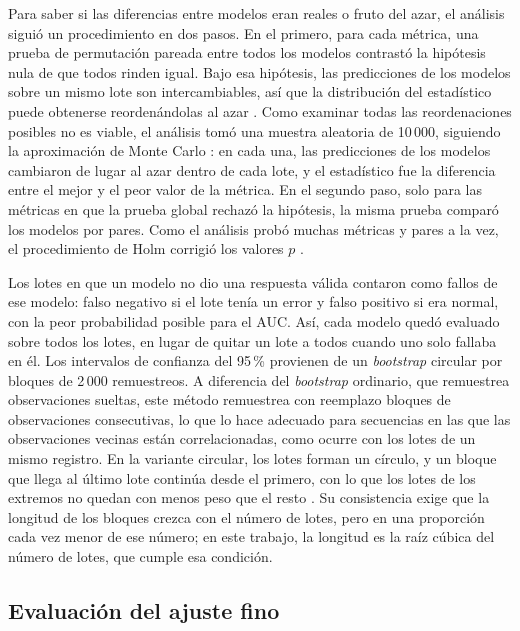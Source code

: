 Para saber si las diferencias entre modelos eran reales o fruto del azar, el análisis siguió un procedimiento en dos pasos. En el primero, para cada métrica, una prueba de permutación pareada entre todos los modelos contrastó la hipótesis nula de que todos rinden igual. Bajo esa hipótesis, las predicciones de los modelos sobre un mismo lote son intercambiables, así que la distribución del estadístico puede obtenerse reordenándolas al azar \cite{good2005_permutation}. Como examinar todas las reordenaciones posibles no es viable, el análisis tomó una muestra aleatoria de 10\,000, siguiendo la aproximación de Monte Carlo \cite{good2005_permutation}: en cada una, las predicciones de los modelos cambiaron de lugar al azar dentro de cada lote, y el estadístico fue la diferencia entre el mejor y el peor valor de la métrica. En el segundo paso, solo para las métricas en que la prueba global rechazó la hipótesis, la misma prueba comparó los modelos por pares. Como el análisis probó muchas métricas y pares a la vez, el procedimiento de Holm corrigió los valores $p$ \cite{holm1979_sequential}.

Los lotes en que un modelo no dio una respuesta válida contaron como fallos de ese modelo: falso negativo si el lote tenía un error y falso positivo si era normal, con la peor probabilidad posible para el AUC. Así, cada modelo quedó evaluado sobre todos los lotes, en lugar de quitar un lote a todos cuando uno solo fallaba en él. Los intervalos de confianza del 95\,\% provienen de un \textit{bootstrap} circular por bloques de 2\,000 remuestreos. A diferencia del \textit{bootstrap} ordinario, que remuestrea observaciones sueltas, este método remuestrea con reemplazo bloques de observaciones consecutivas, lo que lo hace adecuado para secuencias en las que las observaciones vecinas están correlacionadas, como ocurre con los lotes de un mismo registro. En la variante circular, los lotes forman un círculo, y un bloque que llega al último lote continúa desde el primero, con lo que los lotes de los extremos no quedan con menos peso que el resto \cite{politis1991_circular}. Su consistencia exige que la longitud de los bloques crezca con el número de lotes, pero en una proporción cada vez menor de ese número; en este trabajo, la longitud es la raíz cúbica del número de lotes, que cumple esa condición.

\subsection{Evaluación del ajuste fino}

